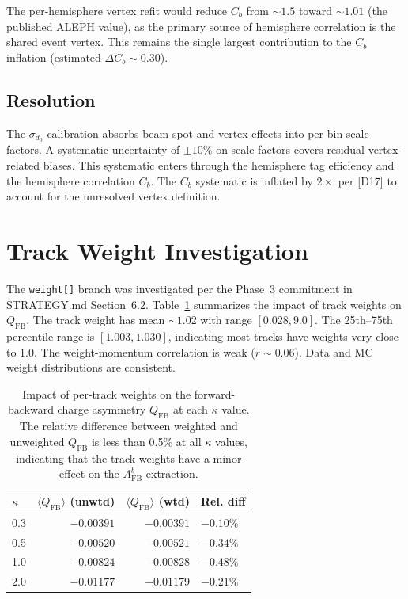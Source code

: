 \documentclass[11pt,a4paper]{article}
\begin{document}
The per-hemisphere vertex refit would reduce $C_b$ from $\sim 1.5$ toward $\sim 1.01$
(the published ALEPH value), as the primary source of hemisphere correlation is the
shared event vertex. This remains the single largest contribution to the $C_b$
inflation (estimated $\Delta C_b \sim 0.30$).

\subsection{Resolution}

The $\sigma_{d_0}$ calibration absorbs beam spot and vertex effects into per-bin scale
factors. A systematic uncertainty of $\pm 10\%$ on scale factors covers residual
vertex-related biases. This systematic enters through the hemisphere tag efficiency
and the hemisphere correlation $C_b$. The $C_b$ systematic is inflated by $2\times$
per [D17] to account for the unresolved vertex definition.

\section{Track Weight Investigation}
\label{app:track_weights}

The \texttt{weight[]} branch was investigated per the Phase~3 commitment in
STRATEGY.md Section~6.2. Table~\ref{tab:weight_impact} summarizes the impact
of track weights on $Q_\mathrm{FB}$.
The track weight has mean $\sim 1.02$ with range
$[0.028, 9.0]$. The 25th--75th percentile range is $[1.003, 1.030]$, indicating
most tracks have weights very close to 1.0. The weight-momentum correlation is
weak ($r \sim 0.06$). Data and MC weight distributions are consistent.

\begin{table}[htbp]
\centering
\caption{Impact of per-track weights on the forward-backward charge asymmetry
$Q_\mathrm{FB}$ at each $\kappa$ value. The relative difference between weighted
and unweighted $Q_\mathrm{FB}$ is less than 0.5\% at all $\kappa$ values, indicating
that the track weights have a minor effect on the $A_\mathrm{FB}^b$ extraction.}
\label{tab:weight_impact}
\begin{tabular}{lrrl}
\toprule
$\kappa$ & $\langle Q_\mathrm{FB} \rangle$ (unwtd) & $\langle Q_\mathrm{FB} \rangle$ (wtd) & Rel. diff \\
\midrule
0.3 & $-0.00391$ & $-0.00391$ & $-0.10\%$ \\
0.5 & $-0.00520$ & $-0.00521$ & $-0.34\%$ \\
1.0 & $-0.00824$ & $-0.00828$ & $-0.48\%$ \\
2.0 & $-0.01177$ & $-0.01179$ & $-0.21\%$ \\
\bottomrule
\end{tabular}
\end{table}
\end{document}
